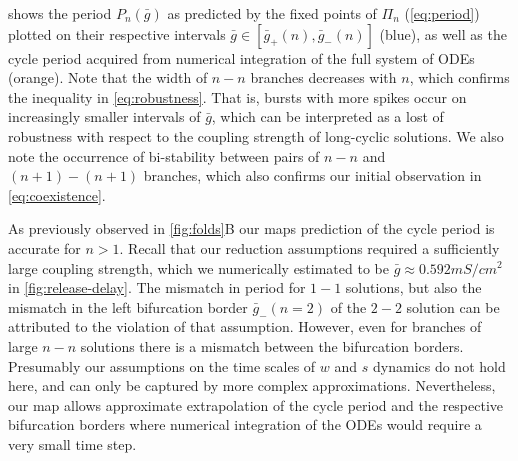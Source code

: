  shows the period $P_n(\bar g)$ as predicted by the fixed points of $\Pi_n$ (\cref{eq:period}) plotted on their respective intervals $\bar g \in [\bar g_+(n),\bar g_-(n)]$ (blue), as well as the cycle period acquired from numerical integration of the full system of ODEs (orange).
Note that the width of $n-n$ branches decreases with $n$, which confirms the inequality in \cref{eq:robustness}.
That is, bursts with more spikes occur on increasingly smaller intervals of $\bar g$, which can be interpreted as a lost of robustness with respect to the coupling strength of long-cyclic solutions.
We also note the occurrence of bi-stability between pairs of $n-n$ and $(n+1)-(n+1)$ branches, which also confirms our initial observation in
\cref{eq:coexistence}.

As previously observed in \cref{fig:folds}B our maps prediction of the cycle period is accurate for $n>1$.
Recall that our reduction assumptions required a sufficiently large coupling strength, which we numerically estimated to be $\bar g \approx 0.592\si{mS/cm^2}$ in \cref{fig:release-delay}.
The mismatch in period for $1-1$ solutions, but also the mismatch in the left bifurcation border $\bar g_-(n=2)$ of the $2-2$ solution can be attributed to the violation of that assumption.
However, even for branches of large $n-n$ solutions there is a mismatch between the bifurcation borders.
Presumably our assumptions on the time scales of $w$ and $s$ dynamics do not hold here, and can only be captured by more complex approximations.
Nevertheless, our map allows approximate extrapolation of the cycle period and the respective bifurcation borders where numerical integration of the ODEs would require a very small time step.
